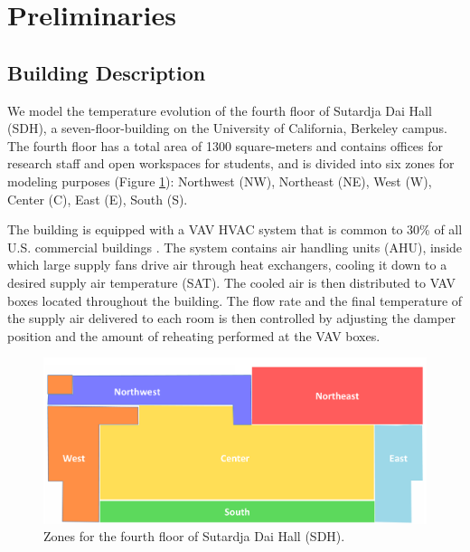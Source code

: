
\section{Preliminaries}
\label{sec:Preliminaries}

\subsection{Building Description}\label{sec:testbed}
We model the temperature evolution of the fourth floor of Sutardja Dai Hall (SDH), a seven-floor-building on the University of California, Berkeley campus. 
The fourth floor has a total area of 1300 square-meters and contains offices for research staff and open workspaces for students, and is divided into six zones for modeling purposes (Figure \ref{fig:floor_plan}): Northwest (NW), Northeast (NE), West (W), Center (C), East (E), South (S).

The building is equipped with a VAV HVAC system that is common to 30\% of all U.S. commercial buildings \cite{VAV}. 
The system contains air handling units (AHU), inside which large supply fans drive air through heat exchangers, cooling it down to a desired supply air temperature (SAT). The cooled air is then distributed to VAV boxes located throughout the building. The flow rate and the final temperature of the supply air delivered to each room is then controlled by adjusting the damper position and the amount of reheating performed at the VAV boxes. 

\begin{figure}[hbtp]
\centering
\vspace*{0.5cm}
\includegraphics[width=\textwidth]{chapters/building_model/figures/FloorPlan.png}
\vspace*{-0.05cm}
\caption{Zones for the fourth floor of Sutardja Dai Hall (SDH).}
\label{fig:floor_plan}
\vspace*{-0.45cm}
\end{figure}

